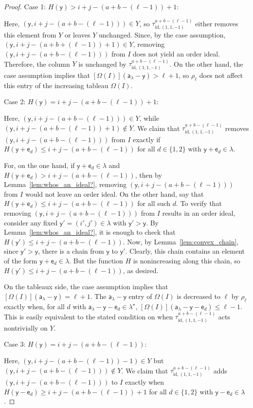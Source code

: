 \documentclass[12pt]{amsart}
\newcommand{\y}{\ensuremath{\mathsf{y}}}
\newcommand{\e}{\ensuremath{\mathsf{e}}}
\newcommand{\aaa}{\ensuremath{\mathsf{a}}}
\theoremstyle{definition}
\theoremstyle{remark}
\numberwithin{equation}{section}
\begin{document}
\begin{proof}
\medskip
\noindent
{\sf Case 1: $H(\y) > i+j-(a+b-(\ell-1))+1$:} 

Here, $(\y,i+j-(a+b-(\ell-1))) \in Y$, so $\tau^{a+b-(\ell-1)}_{\mathrm{id},(1,1,-1)}$ either removes this element from $Y$ or leaves $Y$ unchanged. Since, by the case assumption, $(\y,i+j-(a+b+(\ell-1))+1) \in Y$, removing $(\y,i+j-(a+b-(\ell-1)))$ from $I$ does not yield an order ideal. Therefore, the column $Y$ is unchanged by $\tau^{a+b-(\ell-1)}_{\mathrm{id},(1,1,-1)}$. On the other hand, the case assumption implies that $[\Omega(I)](\aaa_\lambda - \y) > \ell + 1$, so $\rho_{\ell}$ does not affect this entry of the increasing tableau $\Omega(I)$. 

\medskip
\noindent
{\sf Case 2: $H(\y) = i+j-(a+b-(\ell-1))+1$:} 

Here, $(\y,i+j-(a+b-(\ell-1))) \in Y$, while $(\y,i+j-(a+b-(\ell-1))+1) \notin Y$. We claim that $\tau^{a+b-(\ell-1)}_{\mathrm{id},(1,1,-1)}$ removes $(\y,i+j-(a+b-(\ell-1)))$ from $I$ exactly if $H(\y+\e_d) \leq i+j-(a+b-(\ell-1))$ for all $d \in \lbrace 1,2 \rbrace$ with $\y+\e_d \in \lambda$. 

For, on the one hand, if $\y+\e_d \in \lambda$ and $H(\y+\e_d) > i+j-(a+b-(\ell-1))$, then by Lemma~\ref{lem:whos_an_ideal?}, removing $(\y,i+j-(a+b-(\ell-1)))$ from $I$ would not leave an order ideal. 
On the other hand, say that $H(\y+\e_d) \leq i+j-(a+b-(\ell-1))$ for all such $d$. To verify that removing $(\y,i+j-(a+b-(\ell-1)))$ from $I$ results in an order ideal, consider any fixed $\y' = (i',j') \in \lambda$ with $\y' > \y$.  By Lemma~\ref{lem:whos_an_ideal?}, it is enough to check that 
$H(\y') \leq i+j-(a+b-(\ell-1)).$
Now, by Lemma~\ref{lem:convex_chain}, since $\y' > \y$, there is a chain from $\y$ to $\y'$. Clearly, this chain contains an element of the form $\y+\e_{d} \in \lambda$. But the function $H$ is nonincreasing along this chain, so $H(\y') \leq i+j-(a+b-(\ell-1))$, as desired.

On the tableaux side, the case assumption implies that $[\Omega(I)](\aaa_\lambda - \y) = \ell+1$. The $\aaa_\lambda - \y$ entry of $\Omega(I)$ is decreased to $\ell$ by $\rho_\ell$ exactly when, for all $d$ with $\aaa_\lambda - \y -\e_d \in \lambda^\star$, $[\Omega(I)](\aaa_\lambda - \y -\e_d) \leq \ell-1$. This is easily equivalent to the stated condition on when $\tau^{a+b-(\ell-1)}_{\mathrm{id},(1,1,-1)}$ acts nontrivially on $Y$.

\medskip
\noindent
{\sf Case 3: $H(\y) = i+j-(a+b-(\ell-1))$:}

Here, $(\y,i+j-(a+b-(\ell-1))-1) \in Y$ but $(\y,i+j-(a+b-(\ell-1))) \notin Y$. We claim that $\tau^{a+b-(\ell-1)}_{\mathrm{id},(1,1,-1)}$ adds $(\y,i+j-(a+b-(\ell-1)))$ to $I$ exactly when $H(\y-\e_d) \geq i+j-(a+b-(\ell-1))+1$ for all $d \in \lbrace 1,2 \rbrace$ with $\y-\e_d \in \lambda$. 


\end{proof}
\end{document}
